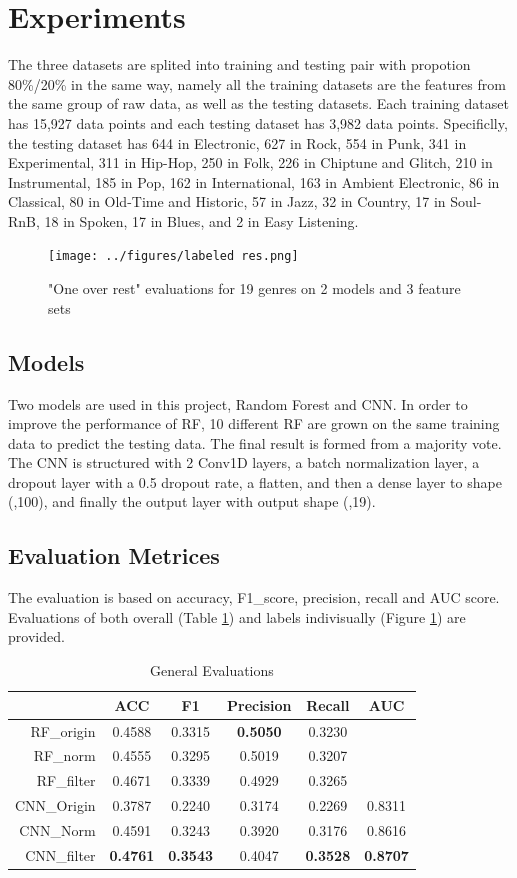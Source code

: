 \documentclass[sigconf ,nonacm]{acmart}
\begin{document}
\section{Experiments}
The three datasets are splited into training and testing pair with propotion 80\%/20\% in the same way, namely all the training datasets are the features from the same group of raw data, as well as the testing datasets. Each training dataset has 15,927 data points and each testing dataset has 3,982 data points. Specificlly, the testing dataset has 644 in Electronic, 627 in Rock, 554 in Punk, 341 in Experimental, 311 in Hip-Hop, 250 in Folk, 226 in Chiptune and Glitch, 210 in Instrumental, 185 in Pop, 162 in International, 163 in Ambient Electronic, 86 in Classical, 80 in Old-Time and Historic, 57 in Jazz, 32 in Country, 17 in Soul-RnB, 18 in Spoken, 17 in Blues, and 2 in Easy Listening.

\begin{figure}
  \texttt{[image: ../figures/labeled res.png]}
  \caption{"One over rest" evaluations for 19 genres on 2 models and 3 feature sets}
  \label{fig:ovr res}
\end{figure}

\subsection{Models}
Two models are used in this project, Random Forest and CNN. In order to improve the performance of RF, 10 different RF are grown on the same training data to predict the testing data. The final result is formed from a majority vote. 
The CNN is structured with 2 Conv1D layers, a batch normalization layer, a dropout layer with a 0.5 dropout rate, a flatten, and then a dense layer to shape (,100), and finally the output layer with output shape (,19). 

\subsection{Evaluation Metrices}
The evaluation is based on accuracy, F1\_score, precision, recall and AUC score. Evaluations of both overall (Table \ref{tabel:gene eval}) and labels indivisually (Figure \ref{fig:ovr res}) are provided. 

\begin{table}[h]
\begin{tabular}{r|c|c|c|c|c}
  & ACC &F1&Precision & Recall& AUC \\ \hline
RF\_origin & 0.4588 & 0.3315 & \textbf{0.5050} & 0.3230 & \\
RF\_norm & 0.4555 & 0.3295 & 0.5019 & 0.3207 & \\
RF\_filter & 0.4671 & 0.3339 & 0.4929 & 0.3265 & \\
CNN\_Origin & 0.3787 & 0.2240 & 0.3174 & 0.2269 & 0.8311 \\
CNN\_Norm & 0.4591 & 0.3243 & 0.3920 & 0.3176  & 0.8616 \\
CNN\_filter & \textbf{0.4761} & \textbf{0.3543} & 0.4047 & \textbf{0.3528} & \textbf{0.8707}
\end{tabular}
\caption{General Evaluations}
\label{tabel:gene eval}
\end{table}
\end{document}
